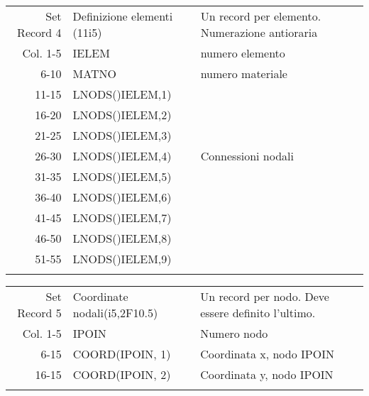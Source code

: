 \begin{tabular}{rll}
	Set Record 4 & Definizione elementi (11i5)    & Un record per elemento. Numerazione antioraria    \\
	Col.  1-5    & IELEM                          & numero elemento                                   \\
	6-10         & MATNO                          & numero materiale                                  \\
	11-15        & LNODS()IELEM,1)                &                                                   \\
	16-20        & LNODS()IELEM,2)                &                                                   \\
	21-25        & LNODS()IELEM,3)                &                                                   \\
	26-30        & LNODS()IELEM,4)                & Connessioni nodali                                \\
	31-35        & LNODS()IELEM,5)                &                                                   \\
	36-40        & LNODS()IELEM,6)                &                                                   \\
	41-45        & LNODS()IELEM,7)                &                                                   \\
	46-50        & LNODS()IELEM,8)                &                                                   \\
	51-55        & LNODS()IELEM,9)                &                                                   \\
	             &                                &                                                   \\	             
\end{tabular}

\begin{tabular}{rll}
	Set Record 5 & Coordinate nodali(i5,2F10.5)   & Un record per nodo. Deve essere definito l'ultimo.\\
	Col. 1-5     & IPOIN                          & Numero nodo                                       \\
	6-15     & COORD(IPOIN, 1)                & Coordinata x, nodo IPOIN                          \\
	16-15     & COORD(IPOIN, 2)                & Coordinata y, nodo IPOIN                          \\
	&                                &                                                   \\	             
\end{tabular}

